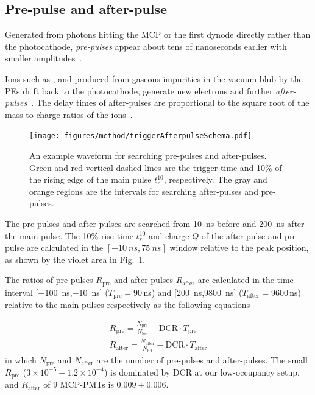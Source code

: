 \subsection{Pre-pulse and after-pulse}
\label{sec:afterpulse}
Generated from photons hitting the MCP or the first dynode directly rather than the photocathode, \emph{pre-pulses} appear about tens of nanoseconds earlier with smaller amplitudes~\cite{JUNOMassTesting}.

Ions such as ,  and  produced from gaseous impurities in the vacuum blub by the PEs drift back to the photocathode, generate new electrons and further \emph{after-pulses}~\cite{JUNOMassTesting,Coates_1973}. The delay times of after-pulses are proportional to the square root of the mass-to-charge ratios of the ions~\cite{XENON1TTesting,Coates_1973,afterpulseTime}. %
\begin{figure}
    \centering
    \texttt{[image: figures/method/triggerAfterpulseSchema.pdf]}
    \caption{An example waveform for searching pre-pulses and after-pulses. Green and red vertical dashed lines are the trigger time and 10\% of the rising edge of the main pulse $t_r^{10}$, respectively. The gray and orange regions are the intervals for searching after-pulses and pre-pulses.}
    \label{fig:afterpulseSchema}
\end{figure}

The pre-pulses and after-pulses are searched from \SI{10}{ns} before and \SI{200}{ns} after the main pulse. The 10\% rise time $t_r^{10}$ and charge $Q$ of the after-pulse and pre-pulse are calculated in the $[-\SI{10}{ns},\SI{75}{ns}]$ window relative to the peak position, as shown by the violet area in Fig.~\ref{fig:afterpulseSchema}.

The ratios of pre-pulses $R_{\mathrm{pre}}$ and after-pulses $R_{\mathrm{after}}$ are calculated in the time interval [\SI{-100}{ns},\SI{-10}{ns}] ($T_{\mathrm{pre}}=90$\,ns) and [\SI{200}{ns},\SI{9800}{ns}] ($T_{\mathrm{after}}=9600$\,ns) relative to the main pulses respectively as the following equations

\begin{align}
    R_{\mathrm{pre}} = \frac{N_{\mathrm{pre}}}{N_\mathrm{hit}} - \mathrm{DCR}\cdot T_{\mathrm{pre}}\\
    R_{\mathrm{after}} = \frac{N_{\mathrm{after}}}{N_\mathrm{hit}} - \mathrm{DCR}\cdot T_{\mathrm{after}}
\end{align}
in which $N_{\mathrm{pre}}$ and $N_{\mathrm{after}}$ are the number of pre-pulses and after-pulses.  The small $R_{\mathrm{pre}}$ ($3\times10^{-5}\pm1.2\times10^{-4}$) is dominated by DCR at our low-occupancy setup, and $R_{\mathrm{after}}$ of 9 MCP-PMTs is $0.009\pm0.006$.


